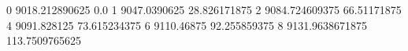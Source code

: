 0 9018.212890625 0.0
1 9047.0390625 28.826171875
2 9084.724609375 66.51171875
4 9091.828125 73.615234375
6 9110.46875 92.255859375
8 9131.9638671875 113.7509765625
